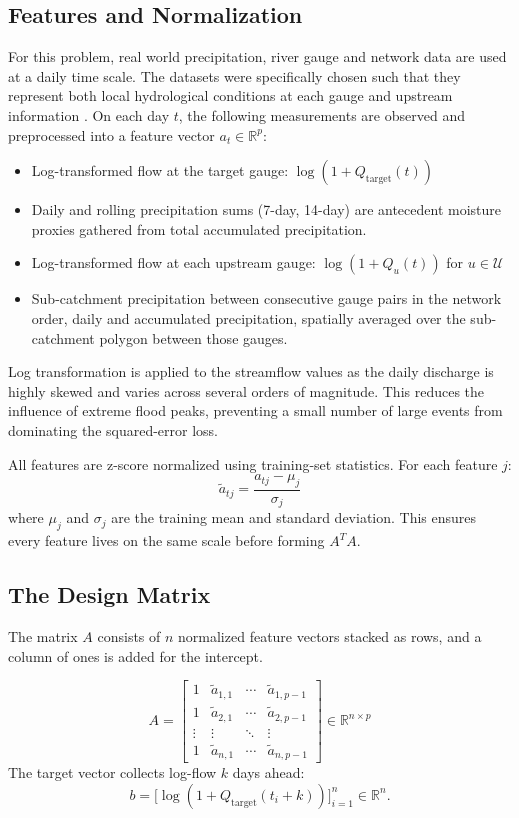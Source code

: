 \documentclass[10pt, twocolumn]{article}
\begin{document}
\subsection{Features and Normalization}
For this problem, real world precipitation, river gauge and network data are used at a daily time scale. The datasets were specifically chosen  such that they represent both local hydrological conditions at each gauge and upstream information \cite{usgs_nwis}. On each day $t$, the following measurements are observed and preprocessed into a feature
vector $a_t \in \mathbb{R}^p$:
\begin{itemize}\setlength\itemsep{1pt}
  \item Log-transformed flow at the target gauge: $\log(1 + Q_{\text{target}}(t))$
  \item Daily and rolling precipitation sums (7-day, 14-day) are antecedent moisture proxies gathered from total accumulated precipitation.
  \item Log-transformed flow at each upstream gauge: $\log(1 + Q_u(t))$ for $u \in \mathcal{U}$
  \item Sub-catchment precipitation between consecutive gauge pairs in the network order, daily and accumulated precipitation, spatially averaged over the sub-catchment polygon between those gauges.
\end{itemize}

Log transformation is applied to the streamflow values as the daily discharge is highly skewed and varies across several orders of magnitude. This reduces the influence of extreme flood peaks, preventing a small number of large events from dominating the squared-error loss.

All features are z-score normalized using training-set statistics. For each feature $j$:
\[
  \tilde{a}_{tj} = \frac{a_{tj} - \mu_j}{\sigma_j}
\]
where $\mu_j$ and $\sigma_j$ are the training mean and standard deviation.
This ensures every feature lives on the same scale before forming $A^T A$.

\subsection{The Design Matrix}
The matrix $A$ consists of  $n$ normalized feature vectors stacked as rows, and a column of ones is added for the intercept. 

\[
A = \begin{bmatrix}
  1 & \tilde{a}_{1,1} & \cdots & \tilde{a}_{1,p-1} \\
  1 & \tilde{a}_{2,1} & \cdots & \tilde{a}_{2,p-1} \\
  \vdots & \vdots & \ddots & \vdots \\
  1 & \tilde{a}_{n,1} & \cdots & \tilde{a}_{n,p-1}
\end{bmatrix}
\in \mathbb{R}^{n \times p}
\]
The target vector collects log-flow $k$ days ahead:
\[
b = \bigl[\log(1 + Q_{\text{target}}(t_i + k))\bigr]_{i=1}^n \in \mathbb{R}^n.
\]
\end{document}
